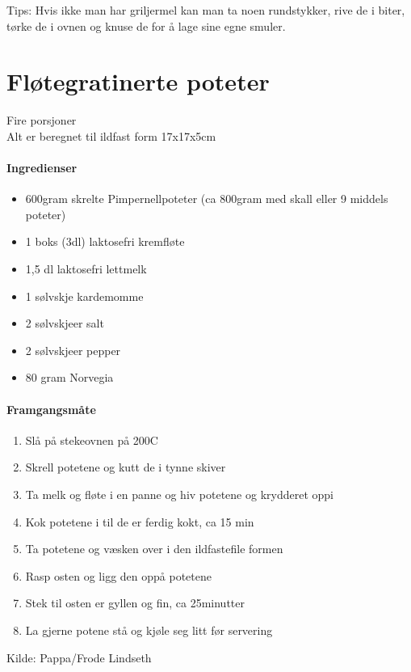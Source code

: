 \documentclass[12pt,a4paper]{book}
\begin{document}
Tips: Hvis ikke man har griljermel kan man ta noen rundstykker, rive de i biter, tørke de i ovnen og knuse de for å lage sine egne smuler.
\clearpage{}
\clearpage{}\section{﻿Fløtegratinerte poteter}
\label{flotegratinerte}
Fire porsjoner\\
Alt er beregnet til ildfast form 17x17x5cm

\paragraph{Ingredienser}
\begin{itemize}[noitemsep]
	\item 600gram skrelte Pimpernellpoteter (ca 800gram med skall eller 9 middels poteter)
	\item	1 boks (3dl) laktosefri kremfløte
	\item 1,5 dl laktosefri lettmelk
	\item 1 sølvskje kardemomme
	\item 2 sølvskjeer salt
	\item 2 sølvskjeer pepper
	\item 80 gram Norvegia
\end{itemize}

\paragraph{Framgangsmåte}
\begin{enumerate}[noitemsep]
	\item Slå på stekeovnen på 200\degree C
	\item Skrell potetene og kutt de i tynne skiver
	\item Ta melk og fløte i en panne og hiv potetene og krydderet oppi
	\item Kok potetene i til de er ferdig kokt, ca 15 min
	\item Ta potetene og væsken over i den ildfastefile formen
	\item Rasp osten og ligg den oppå potetene
	\item Stek til osten er gyllen og fin, ca 25minutter
	\item La gjerne potene stå og kjøle seg litt før servering
\end{enumerate}

Kilde: Pappa/Frode Lindseth\\
\end{document}
